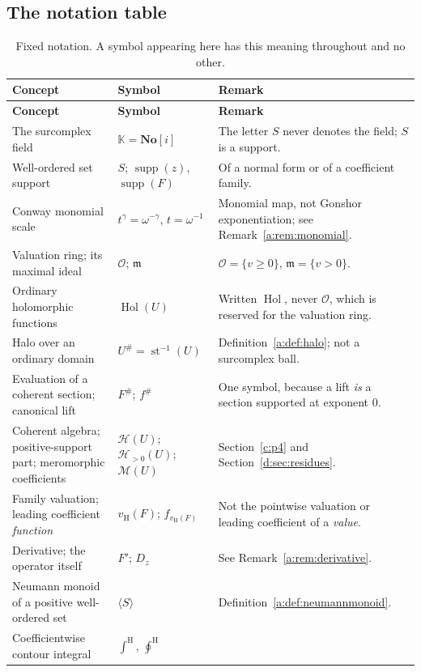 \documentclass[11pt,a4paper]{article}
\numberwithin{equation}{section}
\theoremstyle{definition}
\theoremstyle{remark}
\theoremstyle{plain}
\newcommand{\K}{\mathbb K}
\newcommand{\No}{\mathbf{No}}
\newcommand{\Ov}{\mathcal O}
\newcommand{\mm}{\mathfrak m}
\DeclareMathOperator{\Hol}{Hol}
\DeclareMathOperator{\supp}{supp}
\DeclareMathOperator{\st}{st}
\newcommand{\tm}{t}
\newcommand{\halo}[1]{#1^{\#}}
\newcommand{\ev}[1]{#1^{\#}}
\newcommand{\Hc}{\mathcal H}
\newcommand{\Mc}{\mathcal M}
\newcommand{\vH}{v_{\mathrm H}}
\newcommand{\Neu}[1]{\langle #1\rangle}
\newcommand{\intH}{{\int^{\mathrm H}}}
\newcommand{\ointH}{{\oint^{\mathrm H}}}
\begin{document}
\subsection{The notation table}\label{a:sec:table}

\begingroup
\small
\begin{longtable}{@{}p{}p{}p{}@{}}
\caption{Fixed notation.  A symbol appearing here has this meaning
throughout and no other.}\label{a:tab:notation}\\
\toprule
\textbf{Concept} & \textbf{Symbol} & \textbf{Remark}\\
\midrule
\endfirsthead
\toprule
\textbf{Concept} & \textbf{Symbol} & \textbf{Remark}\\
\midrule
\endhead
\endfoot
\bottomrule
\endlastfoot
The surcomplex field & $\K=\No[i]$ &
 The letter $S$ never denotes the field; $S$ is a support.\\
Well-ordered set support & $S$; $\supp(z)$, $\supp(F)$ &
 Of a normal form or of a coefficient family.\\
Conway monomial scale & $\tm^{\gamma}=\omega^{-\gamma}$, $\tm=\omega^{-1}$ &
 Monomial map, not Gonshor exponentiation; see
 Remark~\ref{a:rem:monomial}.\\
Valuation ring; its maximal ideal & $\Ov$; $\mm$ &
 $\Ov=\{v\ge0\}$, $\mm=\{v>0\}$.\\
Ordinary holomorphic functions & $\Hol(U)$ &
 Written $\Hol$, never $\Ov$, which is reserved for the valuation
 ring.\\
Halo over an ordinary domain & $\halo U=\st^{-1}(U)$ &
 Definition~\ref{a:def:halo}; not a surcomplex ball.\\
Evaluation of a coherent section; canonical lift & $\ev F$; $\ev f$ &
 One symbol, because a lift \emph{is} a section supported at exponent
 $0$.\\
Coherent algebra; positive-support part; meromorphic coefficients &
 $\Hc(U)$; $\Hc_{>0}(U)$; $\Mc(U)$ &
 Section~\ref{c:p4} and Section~\ref{d:sec:residues}.\\
Family valuation; leading coefficient \emph{function} &
 $\vH(F)$; $f_{\vH(F)}$ &
 Not the pointwise valuation or leading coefficient of a \emph{value}.\\
Derivative; the operator itself & $F'$; $D_z$ &
 See Remark~\ref{a:rem:derivative}.\\
Neumann monoid of a positive well-ordered set & $\Neu S$ &
 Definition~\ref{a:def:neumannmonoid}.\\
Coefficientwise contour integral & $\intH$, $\ointH$ &

\end{longtable}
\end{document}
